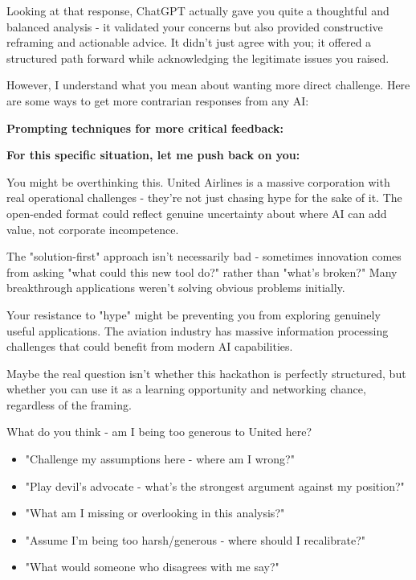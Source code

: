 \begin{botresponse}
Looking at that response, ChatGPT actually gave you quite a thoughtful and balanced analysis - it validated your concerns but also provided constructive reframing and actionable advice. It didn't just agree with you; it offered a structured path forward while acknowledging the legitimate issues you raised.

However, I understand what you mean about wanting more direct challenge. Here are some ways to get more contrarian responses from any AI:

\textbf{Prompting techniques for more critical feedback:}

\textbf{For this specific situation, let me push back on you:}

You might be overthinking this. United Airlines is a massive corporation with real operational challenges - they're not just chasing hype for the sake of it. The open-ended format could reflect genuine uncertainty about where AI can add value, not corporate incompetence.

The "solution-first" approach isn't necessarily bad - sometimes innovation comes from asking "what could this new tool do?" rather than "what's broken?" Many breakthrough applications weren't solving obvious problems initially.

Your resistance to "hype" might be preventing you from exploring genuinely useful applications. The aviation industry has massive information processing challenges that could benefit from modern AI capabilities.

Maybe the real question isn't whether this hackathon is perfectly structured, but whether you can use it as a learning opportunity and networking chance, regardless of the framing.

What do you think - am I being too generous to United here?

\begin{itemize}
\item "Challenge my assumptions here - where am I wrong?"
\item "Play devil's advocate - what's the strongest argument against my position?"
\item "What am I missing or overlooking in this analysis?"
\item "Assume I'm being too harsh/generous - where should I recalibrate?"
\item "What would someone who disagrees with me say?"
\end{itemize}
\end{botresponse}

